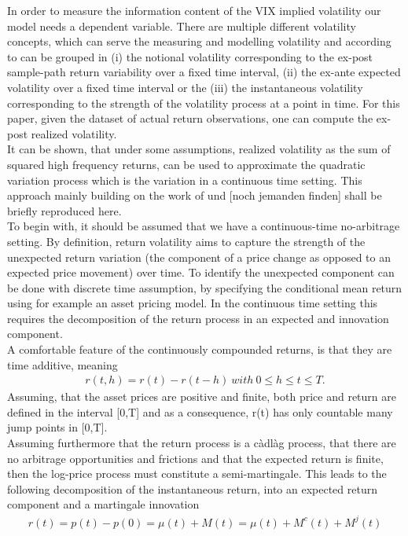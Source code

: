 In order to measure the information content of the VIX implied volatility our model needs a dependent variable. There are multiple different volatility concepts, which can serve the measuring and modelling volatility and according to \citeauthor{andersen2001} can be grouped in (i) the notional volatility corresponding to the ex-post sample-path return variability over a fixed time interval, (ii) the ex-ante expected volatility over a fixed time interval or the (iii) the instantaneous volatility corresponding to the strength of the volatility process at a point in time.
For this paper, given the dataset of actual return observations, one can compute the ex-post realized volatility.\\
It can be shown, that under some assumptions, realized volatility as the sum of squared high frequency returns, can be used to approximate the quadratic variation process which is the variation in a continuous time setting. This approach mainly building on the work of \citeauthor{andersen2001} und [noch jemanden finden] shall be briefly reproduced here. \\
To begin with, it should be assumed that we have a continuous-time no-arbitrage setting. By definition, return volatility aims to capture the strength of the unexpected return variation (the component of a price change as opposed to an expected price movement) over time. To identify the unexpected component can be done with discrete time assumption, by specifying the conditional mean return using for example an asset pricing model. In the continuous time setting this requires the decomposition of the return process in an expected and innovation component. \\
A comfortable feature of the continuously compounded returns, is that they are time additive, meaning
\begin{align*}
r(t,h) = r(t) - r(t-h) \ with \ 0 \leq h \leq t \leq T.
\end{align*}
Assuming, that the asset prices are positive and finite, both price and return are defined in the interval [0,T] and as a consequence, r(t) has only countable many jump points in [0,T]. \\
Assuming furthermore that the return process is a càdlàg process, that there are no arbitrage opportunities and frictions and  that the expected return is finite, then the log-price process must constitute a semi-martingale. This leads to the following decomposition of the instantaneous return, into an expected return component and a martingale innovation
\begin{align*}
r(t) = p(t) - p(0) = \mu(t) + M(t) = \mu(t) + M^{c}(t) + M^{j}(t)
\end{align*}
